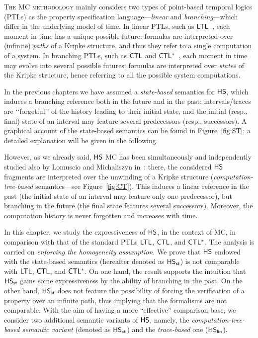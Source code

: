 
\lettrine[lines=3]{T}{he MC methodology} mainly considers two types of point-based temporal logics (PTLs) as the property specification language---\emph{linear} and \emph{branching}---which differ 
in the underlying model of time.
In linear PTLs, such as $\text{\sffamily LTL}$~\cite{Pnu77}, each moment in time has a unique possible future:
formulas are interpreted over (infinite) \emph{paths} of a Kripke structure, and thus they refer to a single computation of a system.
In branching PTLs,
such as $\text{\sffamily CTL}$ and $\text{\sffamily CTL$^{*}$}$~\cite{EH86}, each moment in time may evolve into several possible futures:
formulas are interpreted over \emph{states} of the Kripke structure, hence referring to all the possible system computations.

In the previous chapters we have assumed a \emph{state-based} semantics for $\text{\sffamily HS}$, which
induces a branching reference both in the future and in the past:
intervals/traces 
are \lq\lq forgetful\rq\rq{} of the history leading to their initial state, and  
the initial (resp., final) state of an interval may feature several predecessors (resp., successors).
A graphical account of the state-based semantics can be found in Figure~\ref{fig:ST}; a detailed explanation will be given in the following.



However, as we already said, $\text{\sffamily HS}$ MC has been simultaneously and independently studied also by Lomuscio and Michaliszyn in~\cite{LM13,LM14,lm16}:
there, the considered $\text{\sffamily HS}$ fragments are interpreted over the unwinding of a Kripke structure (\emph{computation-tree-based} semantics---see Figure~\ref{fig:CT}). %
This induces a linear reference in the past (the initial state of an interval may feature only one predecessor), but branching in the future (the final state features several successors). Moreover, the computation history is never forgotten and increases with time.



In this chapter, we study the expressiveness of $\text{\sffamily HS}$, in the context of MC, in comparison with that of the standard PTLs $\text{\sffamily LTL}$, $\text{\sffamily CTL}$, and $\text{\sffamily CTL$^{*}$}$. The analysis is carried on \emph{enforcing the homogeneity assumption}.
% 
We prove that $\text{\sffamily HS}$ endowed with the state-based semantics (hereafter denoted as $\text{\sffamily HS}_{\mathsf{st}}$) is not comparable with $\text{\sffamily LTL}$, $\text{\sffamily CTL}$, and $\text{\sffamily CTL$^{*}$}$. On one hand, the result supports the intuition that $\text{\sffamily HS}_{\mathsf{st}}$ gains some expressiveness by the ability of branching in the past. On the other hand, $\text{\sffamily HS}_{\mathsf{st}}$ does not feature the possibility of forcing the verification of a property over an %
infinite path, thus implying that the formalisms are not comparable. With the aim of having a more ``effective'' comparison base, we consider two additional semantic variants of $\text{\sffamily HS}$, 
namely, the \emph{computation-tree-based semantic variant} (denoted as $\text{\sffamily HS}_{\mathsf{ct}}$) and the \emph{trace-based} one ($\text{\sffamily HS}_{\mathsf{lin}}$). 


